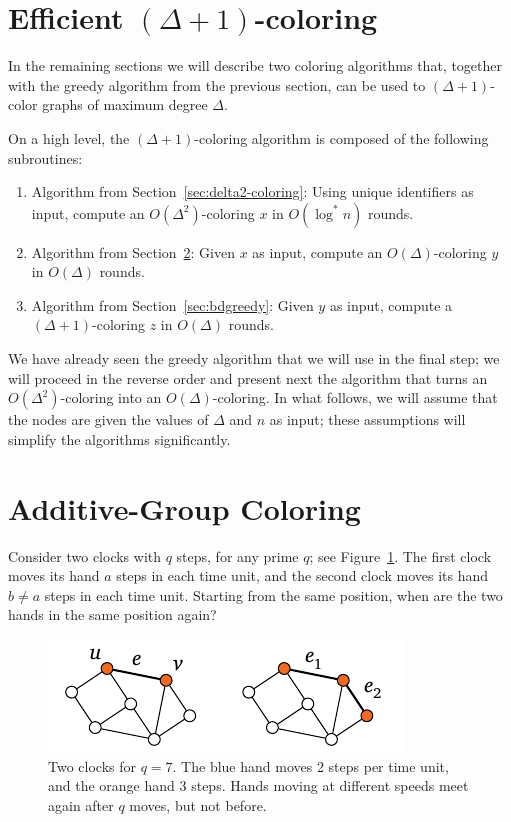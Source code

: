 \section[{Efficient \texorpdfstring{$(\Delta+1)$}{(Δ+1)}-coloring}]{\boldmath Efficient $(\Delta+1)$-coloring}

In the remaining sections we will describe two coloring algorithms that, together with the greedy algorithm from the previous section, can be used to $(\Delta+1)$-color graphs of maximum degree $\Delta$.

On a high level, the $(\Delta+1)$-coloring algorithm is composed of the following subroutines:
\begin{enumerate}
  \item Algorithm from Section~\ref{sec:delta2-coloring}: Using unique identifiers as input, compute an $O(\Delta^2)$-coloring $x$ in $O(\log^* n)$ rounds.
  \item Algorithm from Section~\ref{sec:additive-group-col}: Given $x$ as input, compute an $O(\Delta)$-coloring $y$ in $O(\Delta)$ rounds.
  \item Algorithm from Section~\ref{sec:bdgreedy}: Given $y$ as input, compute a $(\Delta+1)$-coloring $z$ in $O(\Delta)$ rounds.
\end{enumerate}
We have already seen the greedy algorithm that we will use in the final step; we will proceed in the reverse order and present next the algorithm that turns an $O(\Delta^2)$-coloring into an $O(\Delta)$-coloring. In what follows, we will assume that the nodes are given the values of $\Delta$ and $n$ as input; these assumptions will simplify the algorithms significantly.

\section{Additive-Group Coloring} \label{sec:additive-group-col}

Consider two clocks with $q$ steps, for any prime $q$; see Figure~\ref{fig:clocks}. The first clock moves its hand $a$ steps in each time unit, and the second clock moves its hand $b \neq a$ steps in each time unit. Starting from the same position, when are the two hands in the same position again?

\begin{figure}
    \centering
    \includegraphics[scale=0.25,page=\PClocks]{figs.pdf}
    \caption{Two clocks for $q=7$. The blue hand moves 2 steps per time unit, and the orange hand 3 steps. Hands moving at different speeds meet again after $q$ moves, but not before.}\label{fig:clocks}
\end{figure}


